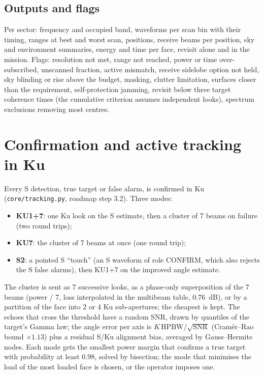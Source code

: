 \documentclass[11pt,a4paper]{article}
\newcommand{\code}[1]{\texttt{\small #1}}
\begin{document}
\subsection{Outputs and flags}
Per sector: frequency and occupied band, waveforms per scan bin with their timing, ranges at best and worst scan,
positions, receive beams per position, sky and environment summaries, energy and time per face, revisit alone and in
the mission. Flags: resolution not met, range not reached, power or time over-subscribed, unscanned fraction,
active mismatch, receive sidelobe option not held, sky blinding or rise above the budget, masking, clutter limitation,
surfaces closer than the requirement, self-protection jamming, revisit below three target coherence times (the
cumulative criterion assumes independent looks), spectrum exclusions removing most centres.

\section{Confirmation and active tracking in Ku}\label{sec:ku}
Every S detection, true target or false alarm, is confirmed in Ku (\code{core/tracking.py}, roadmap step 3.2). Three modes:
\begin{itemize}
  \item \textbf{KU1+7}: one Ku look on the S estimate, then a cluster of 7 beams on failure (two round trips);
  \item \textbf{KU7}: the cluster of 7 beams at once (one round trip);
  \item \textbf{S2}: a pointed S ``touch'' (an S waveform of role CONFIRM, which also rejects the S false alarms),
  then KU1+7 on the improved angle estimate.
\end{itemize}
The cluster is sent as 7 successive looks, as a phase-only superposition of the 7 beams (power / 7, loss interpolated
in the multibeam table, \SI{0.76}{dB}), or by a partition of the face into 2 or 4 Ku sub-apertures; the cheapest is
kept. The echoes that cross the threshold have a random SNR, drawn by quantiles of the target's Gamma law; the angle
error per axis is $K\,\mathrm{HPBW}/\sqrt{\mathrm{SNR}}$ (Cram\'er--Rao bound $\times 1.13$) plus a residual S/Ku
alignment bias, averaged by Gauss--Hermite nodes. Each mode gets the smallest power margin that confirms a true target
with probability at least 0.98, solved by bisection; the mode that minimises the load of the most loaded face is
chosen, or the operator imposes one.
\end{document}
